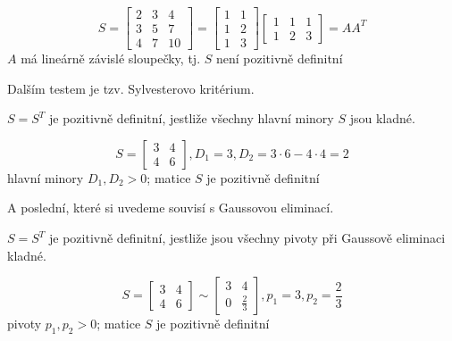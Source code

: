 \begin{pr}
    $$
        S = 
        \begin{bmatrix}
            2 & 3 & 4 \\
            3 & 5 & 7 \\
            4 & 7 & 10
        \end{bmatrix} =
        \begin{bmatrix}
            1 & 1 \\
            1 & 2 \\
            1 & 3
        \end{bmatrix}
        \begin{bmatrix}
            1 & 1 & 1 \\
            1 & 2 & 3
        \end{bmatrix} =
        AA^T
    $$
    $A$ má lineárně závislé sloupečky, tj. $S$ není pozitivně definitní
\end{pr}

Dalším testem je tzv. Sylvesterovo kritérium.

\begin{vt}
    $S = S^T$ je pozitivně definitní, jestliže všechny hlavní minory $S$ jsou kladné.
\end{vt}

\begin{pr}
    $$  S =
        \begin{bmatrix}
            3 & 4 \\
            4 & 6
        \end{bmatrix},
        D_1 = 3,
        D_2 = 3 \cdot 6 - 4 \cdot 4 = 2 
    $$
    hlavní minory $D_1, D_2 > 0$; matice $S$ je pozitivně definitní 
\end{pr}

A poslední, které si uvedeme souvisí s Gaussovou eliminací.

\begin{vt}
    $S = S^T$ je pozitivně definitní, jestliže jsou všechny pivoty při Gaussově eliminaci kladné.
\end{vt}

\begin{pr}
    $$  S =
        \begin{bmatrix}
            3 & 4 \\
            4 & 6
        \end{bmatrix}
        \sim
        \begin{bmatrix}
            3 & 4 \\
            0 & \frac{2}{3}
        \end{bmatrix},
        p_1 = 3, p_2 = \frac{2}{3} 
    $$
    pivoty $p_1, p_2 > 0$; matice $S$ je pozitivně definitní
\end{pr}


